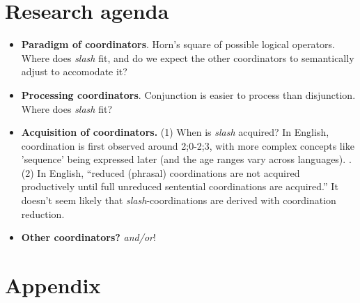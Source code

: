 \documentclass[charis,linguex,biblatex]{glossa}
\begin{document}
\section{Research agenda}

\begin{itemize}
	\item \textbf{Paradigm of coordinators}. Horn's square of possible logical operators. Where does \textit{slash} fit, and do we expect the other coordinators to semantically adjust to accomodate it? 
	\item \textbf{Processing coordinators}. Conjunction is easier to process than disjunction. Where does \textit{slash} fit?
	\item \textbf{Acquisition of coordinators.} (1) When is \textit{slash} acquired? In English, coordination is first observed around 2;0-2;3, with more complex concepts like 'sequence' being expressed later (and the age ranges vary across languages). \citep[72]{Clancy:1976}. (2) In English, ``reduced (phrasal) coordinations are not acquired productively until full unreduced sentential coordinations are acquired.'' \citep[81]{Lust:1980} It doesn't seem likely that \textit{slash}-coordinations are derived with coordination reduction. 
	\item \textbf{Other coordinators?} \textit{and/or}!
\end{itemize}










\section*{Appendix}
\end{document}
